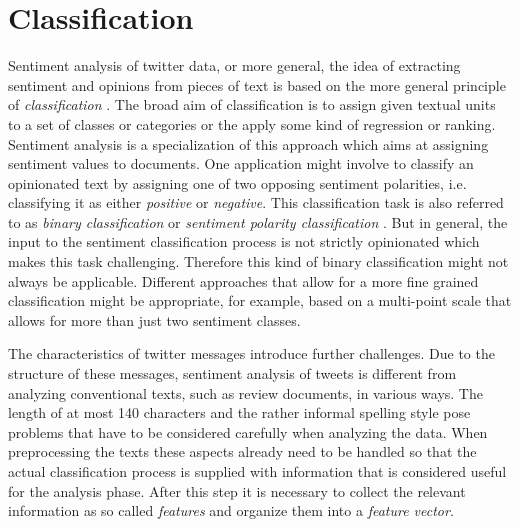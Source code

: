 \section{Classification}


%

Sentiment analysis of twitter data, or more general, the idea of extracting sentiment and opinions from pieces of text is based on the more general principle of \emph{classification} \cite{Pang2002}. The broad aim of classification is to assign given textual units to a set of classes or categories or the apply some kind of regression or ranking. Sentiment analysis is a specialization of this approach which aims at assigning sentiment values to documents. One application might involve to classify an opinionated text by assigning one of two opposing sentiment polarities, i.e. classifying it as either \emph{positive} or \emph{negative}. This classification task is also referred to as \emph{binary classification} or \emph{sentiment polarity classification} \cite{Pang2002}. But in general, the input to the sentiment classification process is not strictly opinionated which makes this task challenging. Therefore this kind of binary classification might not always be applicable. Different approaches that allow for a more fine grained classification might be appropriate, for example, based on a multi-point scale that allows for more than just two sentiment classes.

The characteristics of twitter messages introduce further challenges. Due to the structure of these messages, sentiment analysis of tweets is different from analyzing conventional texts, such as review documents, in various ways. The length of at most 140 characters and the rather informal spelling style pose problems that have to be considered carefully when analyzing the data. When preprocessing the texts these aspects already need to be handled so that the actual classification process is supplied with information that is considered useful for the analysis phase. After this step it is necessary to collect the relevant information as so called \emph{features} and organize them into a \emph{feature vector}.

